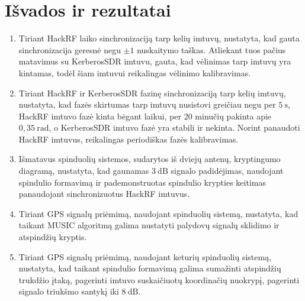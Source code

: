 \documentclass[../gnss_interference_resistant_thesis.tex]{subfiles}
\begin{document}
\section*{Išvados ir rezultatai}

\begin{enumerate}
    \item Tiriant HackRF laiko sinchronizaciją tarp kelių imtuvų, nustatyta, kad gauta sin\-chro\-ni\-za\-ci\-ja
          geresnė negu $\pm 1$ nuskaitymo taškas. Atliekant tuos pačius matavimus su KerberosSDR imtuvu,
          gauta, kad vėlinimas tarp imtuvų yra kintamas, todėl šiam imtuvui reikalingas vėlinimo kalibravimas.
    \item Tiriant HackRF ir KerberosSDR fazinę sinchronizaciją tarp kelių imtuvų, nustatyta, kad fazės skirtumas
          tarp imtuvų nusistovi greičiau negu per $5\ \mathrm{s}$, HackRF imtuvo fazė kinta bėgant laikui, per
          20 minučių pakinta apie $0,35\ \mathrm{rad}$, o KerberosSDR imtuvo fazė yra stabili ir nekinta.
          Norint panaudoti HackRF imtuvus, reikalingas periodiškas fazės kalibravimas.
    \item Išmatavus spinduolių sistemos, sudarytos iš dviejų antenų, kryptingumo diagramą, nu\-sta\-ty\-ta, kad gaunamas $3\ \mathrm{dB}$
          signalo padidėjimas, naudojant spindulio formavimą ir pa\-de\-mon\-struo\-tas spindulio krypties keitimas
          panaudojant sinchronizuotus HackRF imtuvus.
    \item Tiriant GPS signalų priėmimą, naudojant spinduolių sistemą, nustatyta, kad taikant MUSIC algoritmą
          galima nustatyti palydovų signalų sklidimo ir atspindžių kryptis.
    \item Tiriant GPS signalų priėmimą, naudojant keturių spinduolių sistemą, nustatyta, kad taikant spindulio formavimą
          galima sumažinti atspindžių trukdžio įtaką, pagerinti imtuvo suskaičiuotų koordinačių nuokrypį, pagerinti
          signalo triukšmo santykį iki $8\ \mathrm{dB}$.
\end{enumerate}
\end{document}
